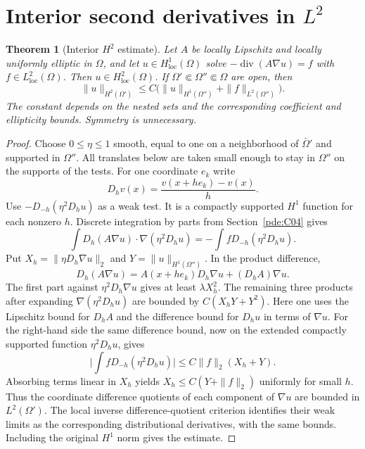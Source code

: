 \documentclass[11pt,oneside,openany]{book}
\theoremstyle{plain}
\newtheorem{theorem}{Theorem}[chapter]
\theoremstyle{definition}
\theoremstyle{remark}
\begin{document}
\section{Interior second derivatives in \texorpdfstring{\(L^2\)}{L2}}\label{pde:E05}

\begin{theorem}[Interior \(H^2\) estimate]\label{pde:elliptic-interior-h2}
Let \(A\) be locally Lipschitz and locally uniformly elliptic in
\(\Omega\), and let \(u\in H^1_{\mathrm{loc}}(\Omega)\) solve
\(-\operatorname{div}(A\nabla u)=f\) with
\(f\in L^2_{\mathrm{loc}}(\Omega)\). Then \(u\in
H^2_{\mathrm{loc}}(\Omega)\). If \(\Omega'\Subset\Omega''
\Subset\Omega\) are open, then
\[
 \|u\|_{H^2(\Omega')}\leq C
   \bigl(\|u\|_{H^1(\Omega'')}+\|f\|_{L^2(\Omega'')}\bigr).
\]
The constant depends on the nested sets and the corresponding
coefficient and ellipticity bounds. Symmetry is unnecessary.
\end{theorem}

\begin{proof}
Choose \(0\leq\eta\leq1\) smooth, equal to one on a neighborhood
of \(\bar\Omega'\) and supported in \(\Omega''\). All translates
below are taken small enough to stay in \(\Omega''\) on the
supports of the tests. For one coordinate \(e_k\) write
\[
 D_h v(x)=\frac{v(x+he_k)-v(x)}{h}.
\]
Use \(-D_{-h}(\eta^2 D_hu)\) as a weak test. It is a compactly
supported \(H^1\) function for each nonzero \(h\). Discrete
integration by parts from Section~\ref{pde:C04} gives
\[
 \int D_h(A\nabla u)\cdot\nabla(\eta^2D_hu)
       =-\int f D_{-h}(\eta^2D_hu).
\]
Put \(X_h=\|\eta D_h\nabla u\|_2\) and
\(Y=\|u\|_{H^1(\Omega'')}\). In the product difference,
\[
 D_h(A\nabla u)=A(x+he_k)D_h\nabla u+(D_h A)\nabla u.
\]
The first part against \(\eta^2D_h\nabla u\) gives at least
\(\lambda X_h^2\). The remaining three products after expanding
\(\nabla(\eta^2D_hu)\) are bounded by \(C(X_hY+Y^2)\).
Here one uses the Lipschitz bound for \(D_h A\) and the
difference bound for \(D_hu\) in terms of \(\nabla u\).
For the right-hand side the same difference bound, now on the
extended compactly supported function \(\eta^2D_hu\), gives
\[
 \bigl|\textstyle\int f D_{-h}(\eta^2D_hu)\bigr|
       \leq C\|f\|_2(X_h+Y).
\]
Absorbing terms linear in \(X_h\) yields
\(X_h\leq C(Y+\|f\|_2)\) uniformly for small \(h\).
Thus the coordinate difference quotients of each component of
\(\nabla u\) are bounded in \(L^2(\Omega')\). The local inverse
difference-quotient criterion identifies their weak limits as
the corresponding distributional derivatives, with the same
bounds. Including the original \(H^1\) norm gives the estimate.
\end{proof}
\end{document}
